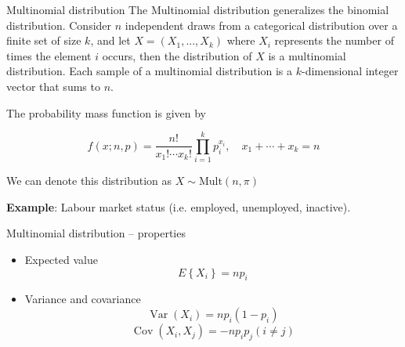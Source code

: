 \documentclass[10pt,ignorenonframetext,aspectratio=169]{beamer}
\begin{document}
\begin{frame}{Multinomial distribution}
    The Multinomial distribution generalizes the binomial distribution. Consider $n$ independent draws from a categorical distribution over a finite set of size $k$, and let $X=(X_1,...,X_k)$ where $X_i$ represents the number of times the element $i$ occurs, then the distribution of $X$ is a multinomial distribution. Each sample of a multinomial distribution is a $k$-dimensional integer vector that sums to $n$.
    
    \vspace{1cm}
    
    The probability mass function is given by

    \begin{equation}
        f(x; n, p) = \frac{n!}{x_1! \cdots x_k!} \prod_{i=1}^k p_i^{x_i},
\quad x_1 + \cdots + x_k = n
    \end{equation}

 We can denote this distribution as $X \sim \mathrm{Mult}(n, \pi)$

\vspace{0.2cm}

    \textbf{Example}: Labour market status (i.e. employed, unemployed, inactive).
  
\end{frame}


\begin{frame}{Multinomial distribution -- properties}

\begin{itemize}
    \item Expected value 
        \begin{equation}
            E \left\{ X _ { i } \right\} = n p _ { i }
        \end{equation}
    \item Variance and covariance
            \begin{equation}
            \operatorname { Var } \left( X _ { i } \right) = n p _ { i } \left( 1 - p _ { i } \right)
        \end{equation}
        \begin{equation}
           \operatorname { Cov } \left( X _ { i } , X _ { j } \right) = - n p _ { i } p _ { j } ( i \neq j )
        \end{equation}
\end{itemize}
\end{frame}
\end{document}
